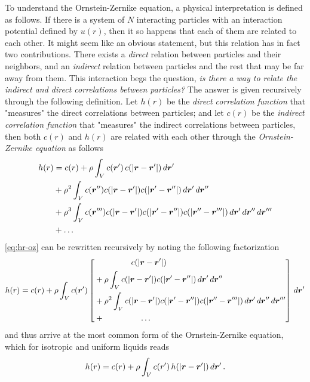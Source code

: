 To understand the Ornstein-Zernike equation, a physical interpretation is defined as
follows. If there is a system of $N$ interacting particles with an interaction potential
defined by $u(r)$, then it so happens that each of them are related to each other.
It might seem like an obvious statement, but this relation has in fact two contributions.
There exists a \emph{direct} relation between particles and
their neighbors, and an \emph{indirect} relation between particles and the rest that
may be far away from them. This interaction begs the question,
\emph{is there a way to relate the indirect and direct correlations between particles?}
The answer is given recursively through the following definition. Let $h(r)$ be the
\emph{direct correlation function} that "measures" the direct correlations between
particles; and let $c(r)$ be the \emph{indirect correlation function} that "measures"
the indirect correlations between particles, then both $c(r)$ and $h(r)$ are related
with each other through the \emph{Ornstein-Zernike equation} as follows
\begin{equation}
    \begin{aligned}
        h(r) &= c(r) + \rho \int_{V} c(\bm{r}') \, c(\lvert \bm{r} - \bm{r}' \rvert) \, d \bm{r}' \\
        &+ \rho^2 \int_{V} c(\bm{r}'') c(\lvert \bm{r} - \bm{r}' \rvert) c(\lvert \bm{r}' - \bm{r}'' \rvert) \, d \bm{r}' \, d \bm{r}'' \\
        &+ \rho^3 \int_{V} c(\bm{r}''') c(\lvert \bm{r} - \bm{r}' \rvert) c(\lvert \bm{r}' - \bm{r}'' \rvert) c(\lvert \bm{r}'' - \bm{r}''' \rvert) \, d \bm{r}' \, d \bm{r}''
        \, d \bm{r}''' \\
        &+ \dots
    \end{aligned}
    \label{eq:hr-oz}
\end{equation}
\autoref{eq:hr-oz} can be rewritten recursively by noting the following factorization
\begin{equation}
    h(r) = c(r) + \rho \int_{V} c(\bm{r}') \left[
    \begin{aligned}
        & \hspace{1.6cm} c(\lvert \bm{r} - \bm{r}' \rvert) \\
        &+ \rho \int_{V} c(\lvert \bm{r} - \bm{r}' \rvert) c(\lvert \bm{r}' - \bm{r}'' \rvert) \, d \bm{r}' \, d \bm{r}'' \\
        &+ \rho^2 \int_{V} c(\lvert \bm{r} - \bm{r}' \rvert) c(\lvert \bm{r}' - \bm{r}'' \rvert) c(\lvert \bm{r}'' - \bm{r}''' \rvert) \, d \bm{r}' \, d \bm{r}''
        \, d \bm{r}''' \\
        &+ \hspace{1.6cm} \dots
    \end{aligned}
    \right] \, d \bm{r}'
    \label{eq:oz-factorization}
\end{equation}
and thus arrive at the most common form of the Ornstein-Zernike equation, which for
isotropic and uniform liquids reads
\begin{equation}
    h(r) = c(r) + \rho \int_{V} c(r') \, h(\lvert \bm{r} - \bm{r}' \rvert) \, d \bm{r}'
    \, .
    \label{eq:ornstein-zernike}
\end{equation}

